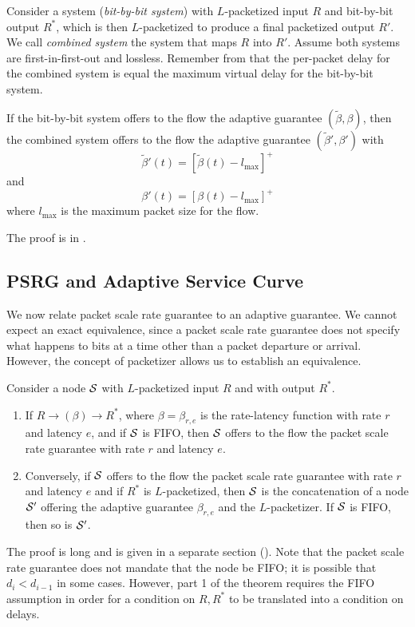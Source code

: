 Consider a system (\emph{bit-by-bit system}) with
$L$-packetized input $R$ and bit-by-bit output $R^*$, which is
then $L$-packetized to produce a final packetized output $R'$.
We call \emph{combined system} the system that maps $R$ into
$R'$. Assume both systems are first-in-first-out and lossless.
Remember from  that the per-packet delay
for the combined system is equal the maximum virtual delay for
the bit-by-bit system.

\begin{theorem}
If the bit-by-bit system offers to the flow the adaptive
guarantee $(\tilde{\beta}, \beta)$, then the combined system
offers to the flow the adaptive guarantee $(\tilde{\beta}',
\beta')$ with
$$\tilde{\beta}'(t) = [\tilde{\beta}(t)-l_{\max}]^+
$$ and
$$\beta'(t) = [\beta(t)-l_{\max}]^+
$$
where $l_{\max}$ is the maximum packet size for the flow.
\end{theorem}
The proof is in .



\subsection{PSRG and Adaptive Service Curve}

We now relate packet scale rate guarantee to an adaptive
guarantee. We cannot expect an exact equivalence, since a
packet scale rate guarantee does not specify what happens to
bits at a time other than a packet departure or arrival.
However, the concept of packetizer allows us to establish an
equivalence.

\begin{theorem}
Consider a node $\mathcal S$ with $L$-packetized input $R$ and with
output $R^*$.
\begin{enumerate}
  \item If $R \rightarrow (\beta)\rightarrow R^*$,
where $\beta=\beta_{r,e}$ is the rate-latency function with
rate $r$ and latency $e$, and if $\mathcal S$ is FIFO, then $\mathcal S$
offers to the flow the packet scale rate guarantee with rate
$r$ and latency $e$.
  \item Conversely, if $\mathcal S$ offers to the flow the packet
scale rate guarantee with rate $r$ and latency $e$ and if
$R^*$ is $L$-packetized, then $\mathcal S$ is the concatenation of
a node $\mathcal S'$ offering the adaptive guarantee $\beta_{r,e}$
and the $L$-packetizer. If $\mathcal S$ is FIFO, then so is
$\mathcal S'$.
\end{enumerate}
\end{theorem}
The proof is long and is given in a separate section
(). Note that the packet scale rate
guarantee does not mandate that the node be FIFO; it is
possible that $d_i < d_{i-1}$ in some cases. However, part 1
of the theorem requires the FIFO assumption in order for a
condition on $R, R^*$ to be translated into a condition on
delays.

